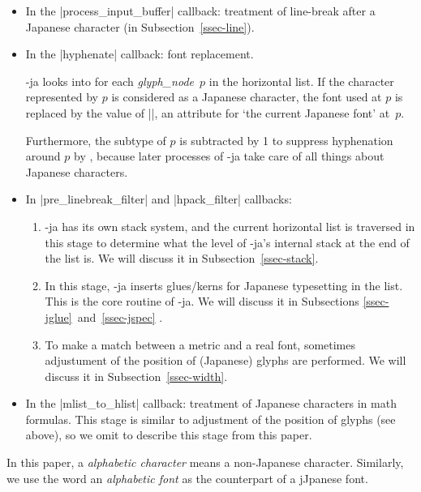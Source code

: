 \documentclass{ajt}
\begin{document}
\begin{itemize}
\item In the |process_input_buffer| callback: treatment of line-break
      after a Japanese character (in Subsection~\ref{ssec-line}).

\item In the |hyphenate| callback: font replacement.

\LuaTeX-ja looks into for each \textit{glyph\_node}~$p$ in the horizontal list. If
	   the character represented by $p$ is considered as a Japanese
	   character, the font used at $p$ is replaced by the value of
	   |\ltj@curjfnt|, an attribute for `the current Japanese font'
	   at~$p$.

Furthermore, the subtype of $p$ is subtracted by 1 to suppress
	   hyphenation around $p$ by \LuaTeX, because later processes of
	   \LuaTeX-ja take care of all things about Japanese characters.

\item In |pre_linebreak_filter| and |hpack_filter| callbacks:

\begin{enumerate}
\item \LuaTeX-ja has its own stack system, and the current horizontal
      list is traversed in this stage to determine what the level of
      \LuaTeX-ja's internal stack at the end of the list is. We will
      discuss it in Subsection~\ref{ssec-stack}.

\item In this stage, \LuaTeX-ja inserts glues/kerns for Japanese
      typesetting in the list. This is the core routine of \LuaTeX-ja.
      We will discuss it in Subsections
      \ref{ssec-jglue}~and~\ref{ssec-jspec} .

\item To make a match between a metric and a real font, sometimes
      adjustument of the position of (Japanese) glyphs are performed.
      We will discuss it in Subsection~\ref{ssec-width}.
\end{enumerate}
\item In the |mlist_to_hlist| callback: treatment of Japanese characters
      in math formulas. This stage is similar to adjustment of the
      position of glyphs (see above), so we omit to describe this stage
      from this paper.
\end{itemize}

In this paper, a \emph{alphabetic character} means a non-Japanese
character. Similarly, we use the word an \emph{alphabetic font} as the
counterpart of a jJpanese font.
\end{document}
